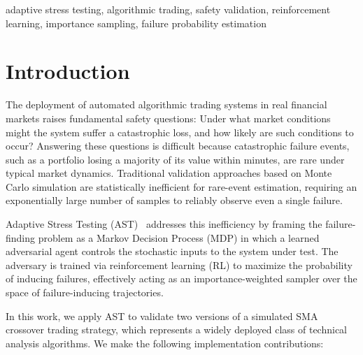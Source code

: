 \documentclass[conference]{IEEEtran}
\begin{document}
\begin{IEEEkeywords}
adaptive stress testing, algorithmic trading, safety validation,
reinforcement learning, importance sampling, failure probability estimation
\end{IEEEkeywords}

\section{Introduction}

The deployment of automated algorithmic trading systems in real financial
markets raises fundamental safety questions: Under what market conditions
might the system suffer a catastrophic loss, and how likely are such conditions
to occur? Answering these questions is difficult because catastrophic failure
events, such as a portfolio losing a majority of its value within minutes, are
rare under typical market dynamics. Traditional validation approaches
based on Monte Carlo simulation are statistically inefficient for rare-event
estimation, requiring an exponentially large number of samples to reliably
observe even a single failure.

Adaptive Stress Testing (AST)~\cite{lee2015adaptive,koren2018adaptive,lee2020adaptive} addresses this
inefficiency by framing the failure-finding problem as a Markov Decision
Process (MDP) in which a learned adversarial agent controls the stochastic
inputs to the system under test. The adversary is trained via reinforcement
learning (RL) to maximize the probability of inducing failures, effectively
acting as an importance-weighted sampler over the space of failure-inducing
trajectories.

In this work, we apply AST to validate two versions of a simulated SMA
crossover trading strategy, which represents a widely deployed class of
technical analysis algorithms. We make the following implementation contributions:
\end{document}
